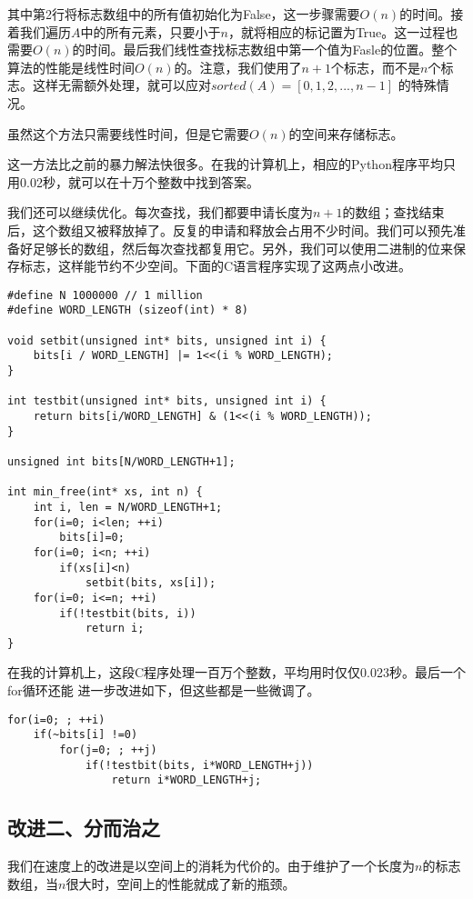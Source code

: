 \documentclass[UTF8]{article}
\begin{document}
其中第2行将标志数组中的所有值初始化为False，这一步骤需要$O(n)$的时间。接着我们遍历$A$中的所有元素，只要小于$n$，就将相应的标记置为True。这一过程也需要$O(n)$的时间。最后我们线性查找标志数组中第一个值为Fasle的位置。整个算法的性能是线性时间$O(n)$的。注意，我们使用了$n+1$个标志，而不是$n$个标志。这样无需额外处理，就可以应对$sorted(A) = [0, 1, 2, ..., n-1]$
的特殊情况。

虽然这个方法只需要线性时间，但是它需要$O(n)$的空间来存储标志。

这一方法比之前的暴力解法快很多。在我的计算机上，相应的Python程序平均只用0.02秒，就可以在十万个整数中找到答案。

我们还可以继续优化。每次查找，我们都要申请长度为$n+1$的数组；查找结束后，这个数组又被释放掉了。反复的申请和释放会占用不少时间。我们可以预先准备好足够长的数组，然后每次查找都复用它。另外，我们可以使用二进制的位来保存标志，这样能节约不少空间。下面的C语言程序实现了这两点小改进。

\lstset{language=C}
\begin{lstlisting}
#define N 1000000 // 1 million
#define WORD_LENGTH (sizeof(int) * 8)

void setbit(unsigned int* bits, unsigned int i) {
    bits[i / WORD_LENGTH] |= 1<<(i % WORD_LENGTH);
}

int testbit(unsigned int* bits, unsigned int i) {
    return bits[i/WORD_LENGTH] & (1<<(i % WORD_LENGTH));
}

unsigned int bits[N/WORD_LENGTH+1];

int min_free(int* xs, int n) {
    int i, len = N/WORD_LENGTH+1;
    for(i=0; i<len; ++i)
        bits[i]=0;
    for(i=0; i<n; ++i)
        if(xs[i]<n)
            setbit(bits, xs[i]);
    for(i=0; i<=n; ++i)
        if(!testbit(bits, i))
            return i;
}
\end{lstlisting}

在我的计算机上，这段C程序处理一百万个整数，平均用时仅仅0.023秒。最后一个for循环还能
进一步改进如下，但这些都是一些微调了。

\begin{lstlisting}
for(i=0; ; ++i)
    if(~bits[i] !=0)
        for(j=0; ; ++j)
	        if(!testbit(bits, i*WORD_LENGTH+j))
	            return i*WORD_LENGTH+j;
\end{lstlisting}

\subsection{改进二、分而治之}
我们在速度上的改进是以空间上的消耗为代价的。由于维护了一个长度为$n$的标志数组，当$n$很大时，空间上的性能就成了新的瓶颈。
\end{document}
